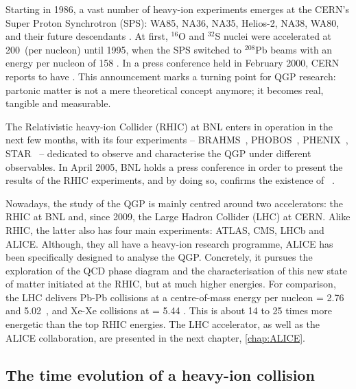 Starting in 1986, a vast number of heavy-ion experiments emerges at the CERN's Super Proton Synchrotron (SPS): WA85, NA36, NA35, Helios-2, NA38, WA80, and their future descendants \cite{satzSPSHeavyIon2004}. At first, $^{16}$O and $^{32}$S nuclei were accelerated at 200~\gev (per nucleon) until 1995, when the SPS switched to $^{208}$Pb beams with an energy per nucleon of 158 \gev. In a press conference held in February 2000, CERN reports to have  \cite{cernNewStateMatter2023}. This announcement marks a turning point for QGP research: partonic matter is not a mere theoretical concept anymore; it becomes real, tangible and measurable.

The Relativistic heavy-ion Collider (RHIC) at BNL enters in operation in the next few months, with its four experiments -- BRAHMS~\cite{arseneQuarkGluonPlasma2005}, PHOBOS~\cite{backPHOBOSPerspectiveDiscoveries2005}, PHENIX~\cite{phenixcollaborationFormationDensePartonic2005}, STAR~\cite{starcollaborationExperimentalTheoreticalChallenges2005} -- dedicated to observe and characterise the QGP under different observables. In April 2005, BNL holds a press conference in order to present the results of the RHIC experiments, and by doing so, confirms the existence of ~\cite{ludlamHUNTINGQUARKGLUON2005}.

Nowadays, the study of the QGP is mainly centred around two accelerators: the RHIC at BNL and, since 2009, the Large Hadron Collider (LHC) at CERN. Alike RHIC, the latter also has four main experiments: ATLAS, CMS, LHCb and ALICE. Although, they all have a heavy-ion research programme, ALICE has been specifically designed to analyse the QGP. Concretely, it pursues the exploration of the QCD phase diagram and the characterisation of this new state of matter initiated at the RHIC, but at much higher energies. For comparison, the LHC delivers Pb-Pb collisions at a centre-of-mass energy per nucleon \sqrtSnn = 2.76 and 5.02~\tev, and \mbox{Xe-Xe} collisions at \sqrtSnn = 5.44 \tev. This is about 14 to 25 times more energetic than the top RHIC energies. The LHC accelerator, as well as the ALICE collaboration, are presented in the next chapter, \chap\ref{chap:ALICE}.


\subsection{The time evolution of a heavy-ion collision}
\label{subsec:BjorkenScenario}

